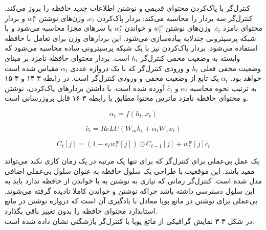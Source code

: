 کنترل‌گر با پاک‌کردن محتوای قدیمی و نوشتن اطلاعات جدید حافظه را بروز می‌کند. کنترل‌گر سه بردار را محاسبه می‌کند: بردار پاک‌کردن $e_t$، وزن‌های نوشتن $w_t^w$ و بردار محتوای نامزد $\bar{c}_t$. وزن‌های نوشتن $w_t^w$ و خواندن $w_t^r$ با سرهای مجزا محاسبه می‌شود و با شبکه پرسپترونی چندلایه  پیاده‌سازی می‌شود. این بردارهای وزن برای تعامل با حافظه استفاده می‌شود. بردار پاک‌کردن نیز با یک شبکه پرسپترونی ساده محاسبه می‌شود که وابسته به وضعیت مخفی کنترل‌گر $h_t$ است. بردار محتوای حافظه نامزد بر مبنای وضعیت مخفی فعلی $h_t$ و ورودی کنترل‌گر که با یک دروازه عددی $\alpha_t$ مقیاس شده است خواهد بود. $\alpha_t$ یک تابع از وضعیت مخفی و ورودی کنترل‌گر است. در رابطه ۳-۱۴ و ۳-۱۵ به ترتیب نحوه محاسبه $\alpha_t$ و $\bar{c}_t$ آورده شده است. با داشتن بردارهای پاک‌کردن، نوشتن و محتوای حافظه نامزد ماترس محتوا مطابق با رابطه ۳-۱۶ قابل بروزرسانی است.\cite{gulcehre2018dynamic}

\begin{equation}
\alpha_t = f(h_t, x_t)
\end{equation}

\begin{equation}
\bar{c}_t = ReLU(W_mh_t + \alpha_tW_xx_t)
\end{equation}

\begin{equation}
C_t[j] = (1-e_tw_t^w[j]) \odot C_{t-1}[j] + w_t^w[j]\bar{c}_t
\end{equation}

یک عمل بی‌عملی برای کنترل‌گر که برای تنها یک مرتبه در یک زمان کاری نکند می‌تواند مفید باشد. این موقعیت با طراحی یک سلول حافظه به عنوان سلول بی‌عملی اضافی مدل شده است. کنترل‌گر زمانی که نیازی به نوشتن به یا خواندن از حافظه ندارد باید به این سلول دسترسی داشته باشد چراکه نوشتن و خواندن کاملا نادیده گرفته می‌شوند. بی‌عملی برای نوشتن در ماتع پویا معادل با یادگیری آن است که دروازه نوشتن در ماتع استاندارد محتوای حافظه را بدون تغییر باقی بگذارد.\cite{gulcehre2018dynamic}
\\

در شکل ۳-۳ نمایش گرافیکی از ماتع پویا با کنترل‌گر بازشگتی نشان داده شده است.
\\

